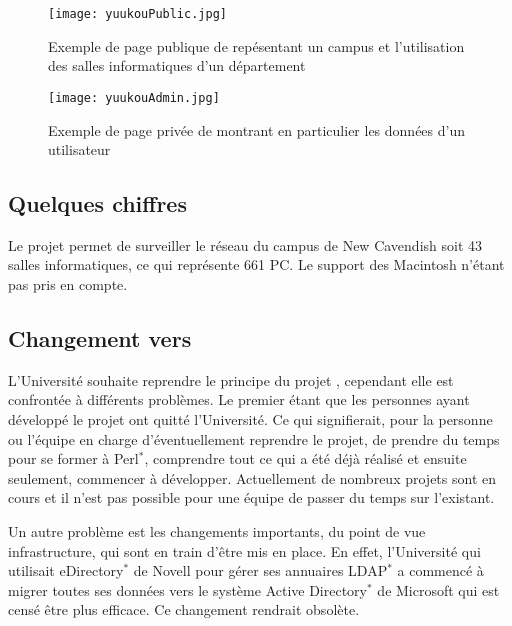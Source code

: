 \begin{figure}[!ht]
	\centering
	\texttt{[image: yuukouPublic.jpg]}
	\caption{Exemple de page publique de \Yuukou{} rep\'esentant un campus et l'utilisation des salles informatiques d'un d\'epartement}
	\label{figure:yuukouPublic}

\end{figure}

\begin{figure}[!ht]
	\centering
	\texttt{[image: yuukouAdmin.jpg]}
	\caption{Exemple de page priv\'ee de \Yuukou{} montrant en particulier les donn\'ees d'un utilisateur}
	\label{figure:yuukouAdmin}

\end{figure}

\subsection{Quelques chiffres}

Le projet \Yuukou{} permet de surveiller le r\'eseau du campus de New Cavendish soit 43 salles informatiques, ce qui repr\'esente 661 PC. 
Le support des Macintosh n'\'etant pas pris en compte.

\subsection{Changement vers \YuukouII}

L'Universit\'e souhaite reprendre le principe du projet \Yuukou, cependant elle est confront\'ee \`a diff\'erents probl\`emes.
Le premier \'etant que les personnes ayant d\'evelopp\'e le projet ont quitt\'e l'Universit\'e. 
Ce qui signifierait, pour la personne ou l'\'equipe en charge d'\'eventuellement reprendre le projet, de prendre du temps pour se former \`a Perl$^*$, comprendre tout ce qui a \'et\'e d\'ej\`a r\'ealis\'e et ensuite seulement, commencer \`a d\'evelopper.
Actuellement de nombreux projets sont en cours et il n'est pas possible pour une \'equipe de passer du temps sur l'existant.

Un autre probl\`eme est les changements importants, du point de vue infrastructure, qui sont en train d'\^etre mis en place.
En effet, l'Universit\'e qui utilisait eDirectory$^*$ de Novell pour g\'erer ses annuaires LDAP$^*$ a commenc\'e \`a migrer toutes ses donn\'ees vers le syst\`eme Active Directory$^*$ de Microsoft qui est cens\'e \^etre plus efficace. Ce changement rendrait \Yuukou{} obsol\`ete.

